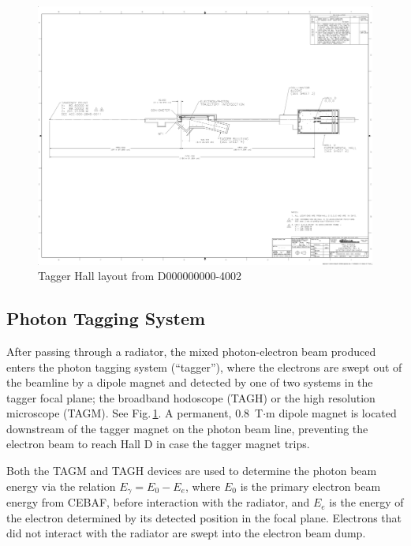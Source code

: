 \begin{figure}[ht]
\begin{center}
   \includegraphics[page=4,viewport=581 1311 3020 2340,clip,angle=0,width=0.98\linewidth]{figures/D000000000-4002_RevB}
\end{center}
\caption{Tagger Hall layout
         from D000000000-4002
        }
\label{fig:beam:tagger-hall} 
\end{figure}

\subsection{Photon Tagging System \label{sec:tag}}
After passing through a radiator, the mixed photon-electron beam produced enters the photon tagging system (``tagger''), where the electrons are swept out of the beamline by a dipole magnet and detected by one of two systems in the tagger focal plane; the broadband hodoscope (TAGH) or the high resolution microscope (TAGM).
See Fig.\,\ref{fig:beam:tagger-hall}.
A permanent, 0.8~T$\cdot$m dipole magnet is located
downstream of the tagger magnet on the photon beam line, preventing
the electron beam to reach Hall D in case the tagger magnet trips.

Both the TAGM and TAGH devices are used to determine the photon beam energy via the relation $E_{\gamma} = E_{0} - E_{e}$, where $E_{0}$ is the primary electron beam energy from CEBAF, before interaction with the radiator, and $E_{e}$ is the energy of the electron determined by its detected position in the focal plane.
Electrons that did not interact with the radiator are swept into the electron beam dump.



